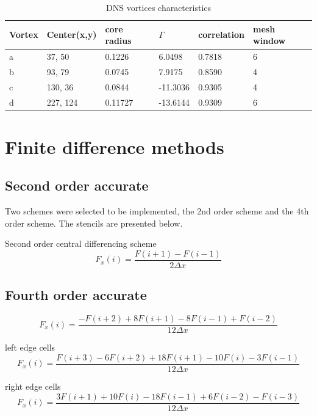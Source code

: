 \documentclass[12pt, a4paper, openany]{memoir}
\begin{document}
\begin{table}[h]
	\centering
	\caption{DNS vortices characteristics}
	\vspace{10px}
	\label{tb:DNSvortices}
	\begin{tabular}{l|l|l|l|l|l}
		Vortex         & Center(x,y) & core radius    & $\Gamma$   & correlation & mesh window \\
		\hline
		a    & 37, 50   & 0.1226  & 6.0498   & 0.7818 & 6 \\
		b    & 93, 79   & 0.0745  & 7.9175   & 0.8590 & 4 \\
		c    & 130, 36  & 0.0844  & -11.3036 & 0.9305 & 4\\
		d    & 227, 124 & 0.11727 & -13.6144 & 0.9309 & 6
	\end{tabular}
\end{table}
  



\newpage



\appendix

\chapter{Finite difference methods}

\section{Second order accurate}
\label{annex:finite}
Two schemes were selected to be implemented, the 2nd order scheme and the 4th order scheme. The stencils are presented below.

Second order central differencing scheme
\begin{equation}
F_x(i) = \frac{F(i+1)-F(i-1)}{2 \Delta x}
\end{equation}

\section{Fourth order accurate}

\begin{equation}
F_x(i) = \frac{-F(i+2)+8F(i+1)-8F(i-1)+F(i-2)}{12 \Delta x}
\end{equation}

left edge cells
\begin{equation}
F_x(i) = \frac{F(i+3)-6F(i+2)+18F(i+1)-10F(i) -3F(i-1)}{12 \Delta x}
\end{equation}

right edge cells
\begin{equation}
F_x(i) = \frac{3F(i+1)+10F(i)-18F(i-1)+6F(i-2) -F(i-3)}{12 \Delta x}
\end{equation}
\end{document}

